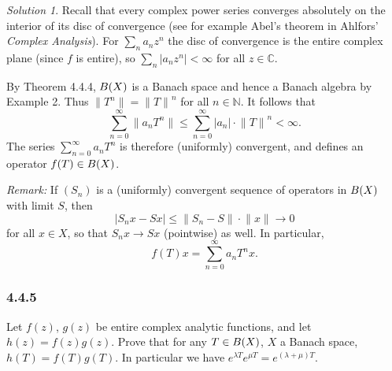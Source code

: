 \documentclass{report}
\newcommand{\bb}[1]{\mathbb{#1}}
\newcommand{\norm}[1]{{\lVert #1 \rVert}}
\let\sc\relax
\newcommand{\sc}[1]{\mathscr{#1}}
\theoremstyle{remark}
\newtheorem*{solution}{Solution}
\begin{document}
\begin{solution}
  Recall that every complex power series converges absolutely on the interior of its disc of convergence (see for example Abel's theorem in Ahlfors' \emph{Complex Analysis}). For $\sum_n a_n z^n$ the disc of convergence is the entire complex plane (since $f$ is entire), so $\sum_n |a_n z^n| < \infty$ for all $z \in \bb C$.

  By Theorem 4.4.4, $\sc B(X)$ is a Banach space and hence a Banach algebra by Example 2. Thus $\norm{T^n} = \norm T^n$ for all $n \in \bb N$. It follows that
  \begin{equation*}
    \sum_{n=0}^\infty \norm{a_n T^n} \le \sum_{n=0}^\infty |a_n| \cdot \norm T^n < \infty.
  \end{equation*}
  The series $\sum_{n=0}^\infty a_n T^n$ is therefore (uniformly) convergent, and defines an operator $f(T) \in \sc B(X)$.

  \emph{Remark:} If $(S_n)$ is a (uniformly) convergent sequence of operators in $\sc B(X)$ with limit $S$, then
  \begin{equation*}
    |S_n x - S x| \le \norm{S_n - S} \cdot \norm x \to 0
  \end{equation*}
  for all $x \in X$, so that $S_n x \to S x$ (pointwise) as well. In particular,
  \begin{equation*}
    f(T) x = \sum_{n=0}^\infty a_n T^n x.
  \end{equation*}
\end{solution}

\subsubsection*{4.4.5}
Let $f(z)$, $g(z)$ be entire complex analytic functions, and let $h(z) = f(z)g(z)$. Prove that for any $T \in \sc B(X)$, $X$ a Banach space, $h(T) = f(T) g(T)$. In particular we have $e^{\lambda T} e^{\mu T} = e^{(\lambda + \mu)T}$.
\end{document}
